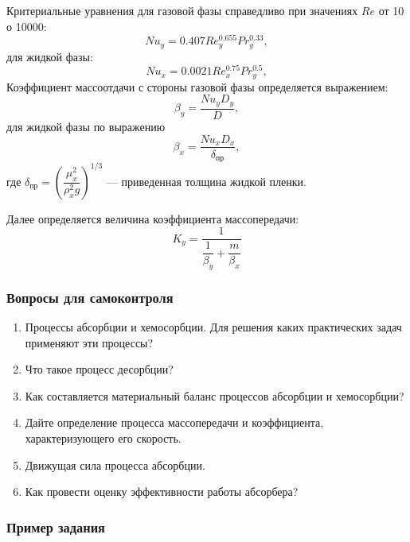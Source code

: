 Критериальные уравнения для газовой фазы справедливо при значениях $Re$ от 10 о 10000:
\begin{equation}
	Nu_y = 0.407 Re_y^{0.655} Pr_y^{0.33},
\end{equation}
для жидкой фазы:
\begin{equation}
Nu_x = 0.0021 Re_x^{0.75} Pr_y^{0.5},
\end{equation}
Коэффициент массоотдачи с стороны газовой фазы определяется выражением:
\begin{equation}
	\beta_y = \dfrac{Nu_y D_y} {D},
\end{equation}
для жидкой фазы по выражению
\begin{equation}
\beta_x = \dfrac{Nu_x D_x}{\delta_{пр}},
\end{equation}
где $\delta_{пр} = \left( \dfrac{\mu_x^2} {\rho_x^2 g} \right)^{1/3} $ --- приведенная толщина жидкой пленки.

Далее определяется величина коэффициента массопередачи:
\begin{equation}
 K_y = \dfrac{1}{\dfrac{1}{\beta_y} + \dfrac{m}{\beta_x}}
\end{equation}

\subsubsection*{Вопросы для самоконтроля}
\begin{enumerate}
	\item Процессы абсорбции и хемосорбции. Для решения каких практических задач применяют эти процессы?
	\item Что такое процесс десорбции?
	\item Как составляется материальный баланс процессов абсорбции и хемосорбции?
	\item Дайте определение процесса массопередачи и коэффициента, характеризующего его скорость.
	\item Движущая сила процесса абсорбции.
	\item Как провести оценку эффективности работы абсорбера?
\end{enumerate}

\subsubsection*{Пример задания}
